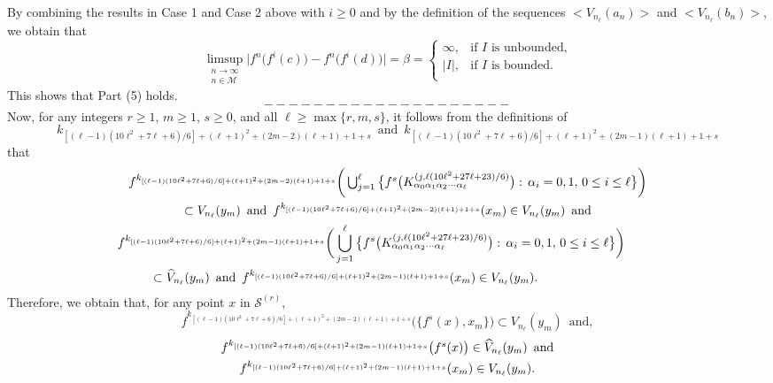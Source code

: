 \documentclass[12pt]{article}
\newcommand{\al}{\alpha}
\begin{document}
By combining the results in Case 1 and Case 2 above with $i \ge 0$ and by the definition of the sequences $<V_{n_\ell}(a_n)>$ and $<V_{n_\ell}(b_n)>$, we obtain that 
$$
\limsup_{\substack{n \to \infty \\ n \in \mathcal M}} \big|f^n\big(f^i(c)\big) - f^n\big(f^i(d)\big)\big| = \beta = \begin{cases}
                       \infty, & \text{if $I$ is unbounded,} \\
                       |I|, & \text{if $I$ is bounded.} \\
                        \end{cases}
$$
This shows that Part (5) holds.
$$--------------------$$
\indent Now, for any integers $r \ge 1$, $m \ge 1$, $s \ge 0$, and all $\ell \ge \max \{ r, m, s \}$, it follows from the definitions of 
$$
k_{[(\ell-1)(10\ell^2+7\ell+6)/6]+(\ell+1)^2+(2m-2)(\ell+1)+1+s} \,\,\, \text{and} \,\,\, k_{[(\ell-1)(10\ell^2+7\ell+6)/6]+(\ell+1)^2+(2m-1)(\ell+1)+1+s}
$$ 
that 
\begin{multline*}
$$
f^{k_{[(\ell-1)(10\ell^2+7\ell+6)/6]+(\ell+1)^2+(2m-2)(\ell+1)+1+s}}\bigg(\bigcup_{j=1}^\ell \big\{ f^s\big(K_{\al_0\al_1\al_2\cdots\al_\ell}^{(j, \ell(10\ell^2+27\ell+23)/6)}\big): \, \al_i = 0, 1, \, 0 \le i \le \ell \big\}\bigg) \\ 
\subset V_{n_\ell}(y_m) \,\,\, \text{and} \,\,\, f^{k_{[(\ell-1)(10\ell^2+7\ell+6)/6]+(\ell+1)^2+(2m-2)(\ell+1)+1+s}}(x_m) \in V_{n_\ell}(y_m) \,\,\, \text{and} \\
f^{k_{[(\ell-1)(10\ell^2+7\ell+6)/6]+(\ell+1)^2+(2m-1)(\ell+1)+1+s}}\bigg(\bigcup_{j=1}^\ell \big\{ f^s\big(K_{\al_0\al_1\al_2\cdots\al_\ell}^{(j, \ell(10\ell^2+27\ell+23)/6)}\big): \, \al_i = 0, 1, \, 0 \le i \le \ell \big\}\bigg) \qquad\,\,\,\, \\ 
\subset \widehat V_{n_\ell}(y_m) \,\,\, \text{and} \,\,\, f^{k_{[(\ell-1)(10\ell^2+7\ell+6)/6]+(\ell+1)^2+(2m-1)(\ell+1)+1+s}}(x_m) \in V_{n_\ell}(y_m). \qquad\qquad\qquad\,\,\,\,\,
$$
\end{multline*}
Therefore, we obtain that, for any point $x$ in $\mathcal S^{(r)}$, 
$$
f^{k_{[(\ell-1)(10\ell^2+7\ell+6)/6]+(\ell+1)^2+(2m-2)(\ell+1)+1+s}}\big(\{ f^s(x), x_m \}\big) \subset V_{n_{\ell}}(y_m) \,\,\, \text{and}, 
$$
\begin{multline*}
$$
f^{k_{[(\ell-1)(10\ell^2+7\ell+6)/6]+(\ell+1)^2+(2m-1)(\ell+1)+1+s}}\big(f^s(x)\big) \in \widehat V_{n_\ell}(y_m) \,\,\, \text{and} \\ f^{k_{[(\ell-1)(10\ell^2+7\ell+6)/6]+(\ell+1)^2+(2m-1)(\ell+1)+1+s}}(x_m) \in V_{n_\ell}(y_m).
$$
\end{multline*}
\end{document}
